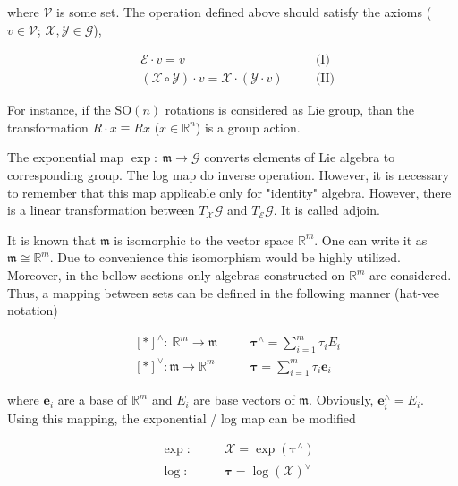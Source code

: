 where $\mathcal{V}$ is some set. The operation defined above should satisfy 
the axioms ($v \in \mathcal{V}$; $\mathcal{X}, \mathcal{Y} \in \mathcal{G}$),

\begin{equation}
    \begin{aligned}
        \label{eqn:act_axi}
        & \mathcal{E} \cdot v = v \quad && \text{(I)} \\
        & (\mathcal{X} \circ \mathcal{Y}) \cdot v = 
        \mathcal{X} \cdot (\mathcal{Y} \cdot v) \quad && \text{(II)}
    \end{aligned}
\end{equation}

For instance, if the $\text{SO}(n)$ rotations is considered as Lie group, than the 
transformation $R \cdot x \equiv R x$ ($x \in \mathbb{R}^n$) is a group action.

The exponential map $\exp:\ \mathfrak{m} \to \mathcal{G}$ converts elements of 
Lie algebra to corresponding group. The log map do inverse operation. 
However, it is necessary to remember that 
this map applicable only for "identity" algebra. However, there is a linear
transformation between $T_{\mathcal{X}} \mathcal{G}$ and $T_{\mathcal{E}} 
\mathcal{G}$. It is called adjoin.

It is known that $\mathfrak{m}$ is isomorphic to the vector space $\mathbb{R}^m$. 
One can write it as $\mathfrak{m} \cong \mathbb{R}^m$. Due to convenience this 
isomorphism would be highly utilized. Moreover, in the bellow sections only 
algebras constructed on $\mathbb{R}^m$ are considered. Thus, a mapping between 
sets can be defined in the following manner (hat-vee notation)

\begin{equation}
    \begin{aligned}
        \label{eqn:hat_vee_not}
        & [*]^\wedge: \ \mathbb{R}^m \to \mathfrak{m} \quad &&
        \boldsymbol{\tau}^\wedge = \sum_{i=1}^{m} \tau_i E_i \\
        & [*]^\vee: \mathfrak{m} \to \mathbb{R}^m \quad && 
        \boldsymbol{\tau} = \sum_{i=1}^{m} \tau_i \mathbf{e}_i
    \end{aligned}
\end{equation}

where $\mathbf{e}_i$ are a base of $\mathbb{R}^m$ and $E_i$ are base vectors 
of $\mathfrak{m}$. Obviously, $\mathbf{e}_i^\wedge = E_i$. Using this mapping, the
exponential / log map can be modified 

\begin{equation}
    \begin{aligned}
        \label{eqn:exp_log_for_r_m}
        & \exp : \quad && \mathcal{X} = \exp(\boldsymbol{\tau}^\wedge) \\
        & \log : \quad && \boldsymbol{\tau} = \log(\mathcal{X})^\vee
    \end{aligned}
\end{equation}


